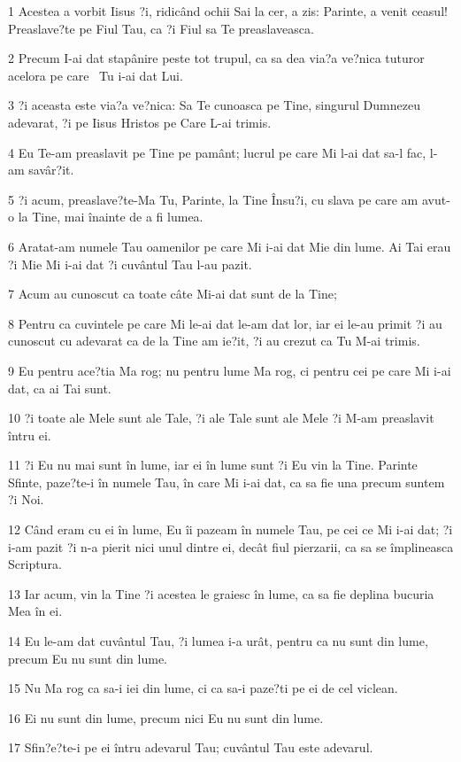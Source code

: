 \par 1 Acestea a vorbit Iisus ?i, ridicând ochii Sai la cer, a zis: Parinte, a venit ceasul! Preaslave?te pe Fiul Tau, ca ?i Fiul sa Te preaslaveasca.
\par 2 Precum I-ai dat stapânire peste tot trupul, ca sa dea via?a ve?nica tuturor acelora pe care  Tu i-ai dat Lui.
\par 3 ?i aceasta este via?a ve?nica: Sa Te cunoasca pe Tine, singurul Dumnezeu adevarat, ?i pe Iisus Hristos pe Care L-ai trimis.
\par 4 Eu Te-am preaslavit pe Tine pe pamânt; lucrul pe care Mi l-ai dat sa-l fac, l-am savâr?it.
\par 5 ?i acum, preaslave?te-Ma Tu, Parinte, la Tine Însu?i, cu slava pe care am avut-o la Tine, mai înainte de a fi lumea.
\par 6 Aratat-am numele Tau oamenilor pe care Mi i-ai dat Mie din lume. Ai Tai erau ?i Mie Mi i-ai dat ?i cuvântul Tau l-au pazit.
\par 7 Acum au cunoscut ca toate câte Mi-ai dat sunt de la Tine;
\par 8 Pentru ca cuvintele pe care Mi le-ai dat le-am dat lor, iar ei le-au primit ?i au cunoscut cu adevarat ca de la Tine am ie?it, ?i au crezut ca Tu M-ai trimis.
\par 9 Eu pentru ace?tia Ma rog; nu pentru lume Ma rog, ci pentru cei pe care Mi i-ai dat, ca ai Tai sunt.
\par 10 ?i toate ale Mele sunt ale Tale, ?i ale Tale sunt ale Mele ?i M-am preaslavit întru ei.
\par 11 ?i Eu nu mai sunt în lume, iar ei în lume sunt ?i Eu vin la Tine. Parinte Sfinte, paze?te-i în numele Tau, în care Mi i-ai dat, ca sa fie una precum suntem ?i Noi.
\par 12 Când eram cu ei în lume, Eu îi pazeam în numele Tau, pe cei ce Mi i-ai dat; ?i i-am pazit ?i n-a pierit nici unul dintre ei, decât fiul pierzarii, ca sa se împlineasca Scriptura.
\par 13 Iar acum, vin la Tine ?i acestea le graiesc în lume, ca sa fie deplina bucuria Mea în ei.
\par 14 Eu le-am dat cuvântul Tau, ?i lumea i-a urât, pentru ca nu sunt din lume, precum Eu nu sunt din lume.
\par 15 Nu Ma rog ca sa-i iei din lume, ci ca sa-i paze?ti pe ei de cel viclean.
\par 16 Ei nu sunt din lume, precum nici Eu nu sunt din lume.
\par 17 Sfin?e?te-i pe ei întru adevarul Tau; cuvântul Tau este adevarul.
